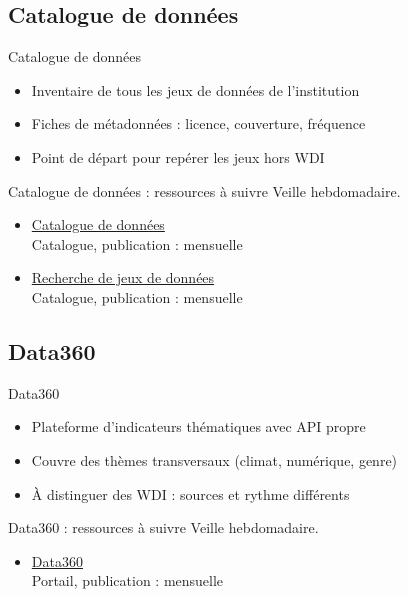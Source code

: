 \documentclass[aspectratio=169,11pt]{beamer}
\begin{document}
\subsection{Catalogue de données}
\begin{frame}{Catalogue de données}
\begin{itemize}
\item Inventaire de tous les jeux de données de l'institution
\item Fiches de métadonnées : licence, couverture, fréquence
\item Point de départ pour repérer les jeux hors WDI
\end{itemize}
\end{frame}

\begin{frame}{Catalogue de données : ressources à suivre}
\small
Veille hebdomadaire.
\begin{itemize}
\item \href{https://datacatalog.worldbank.org}{Catalogue de données}\\{\footnotesize Catalogue, publication : mensuelle}
\item \href{https://datacatalog.worldbank.org/search}{Recherche de jeux de données}\\{\footnotesize Catalogue, publication : mensuelle}
\end{itemize}
\end{frame}

\subsection{Data360}
\begin{frame}{Data360}
\begin{itemize}
\item Plateforme d'indicateurs thématiques avec API propre
\item Couvre des thèmes transversaux (climat, numérique, genre)
\item À distinguer des WDI : sources et rythme différents
\end{itemize}
\end{frame}

\begin{frame}{Data360 : ressources à suivre}
\small
Veille hebdomadaire.
\begin{itemize}
\item \href{https://data360.worldbank.org}{Data360}\\{\footnotesize Portail, publication : mensuelle}
\end{itemize}
\end{frame}
\end{document}
